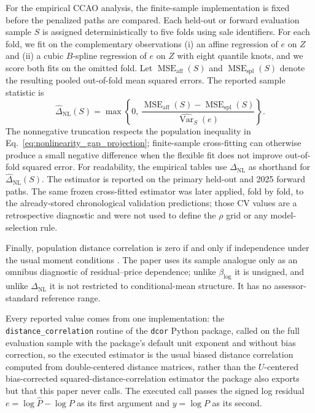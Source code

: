 \documentclass[10pt]{article}
\theoremstyle{definition}
\newcommand{\Var}{\operatorname{Var}}
\newcommand{\1}{\mathbf{1}}
\begin{document}
For the empirical CCAO analysis, the finite-sample implementation is fixed before
the penalized paths are compared. Each held-out or forward evaluation sample $S$ is
assigned deterministically to five folds using sale identifiers. For each fold, we
fit on the complementary observations (i) an affine regression of $e$ on $Z$ and
(ii) a cubic $B$-spline regression of $e$ on $Z$ with eight quantile knots, and we
score both fits on the omitted fold. Let
$\operatorname{MSE}_{\mathrm{aff}}(S)$ and
$\operatorname{MSE}_{\mathrm{spl}}(S)$ denote the resulting pooled out-of-fold mean
squared errors. The reported sample statistic is
\begin{equation}
\label{eq:nonlinearity_gap_estimator}
\widehat{\Delta}_{\mathrm{NL}}(S)
=
\max\left\{
0,\,
\frac{
\operatorname{MSE}_{\mathrm{aff}}(S)
-
\operatorname{MSE}_{\mathrm{spl}}(S)
}{
\widehat{\Var}_S(e)
}
\right\}.
\end{equation}
The nonnegative truncation respects the population inequality in
Eq.~\eqref{eq:nonlinearity_gap_projection}; finite-sample cross-fitting can otherwise
produce a small negative difference when the flexible fit does not improve
out-of-fold squared error. For readability, the empirical tables use
$\Delta_{\mathrm{NL}}$ as shorthand for
$\widehat{\Delta}_{\mathrm{NL}}(S)$.
The estimator is reported on the primary held-out and 2025 forward paths. The same frozen cross-fitted estimator was later applied, fold by fold, to the already-stored chronological validation predictions; those CV values are a retrospective diagnostic and were not used to define the $\rho$ grid or any model-selection rule.

Finally, population distance correlation is zero if and only if independence under
the usual moment conditions \cite{SzekelyRizzoBakirov2007}. The paper uses its
sample analogue only as an omnibus diagnostic of residual--price dependence; unlike
$\beta_{\log}$ it is unsigned, and unlike $\Delta_{\mathrm{NL}}$ it is not restricted
to conditional-mean structure. It has no assessor-standard reference range.

Every reported value comes from one implementation: the
\texttt{distance\_correlation} routine of the \texttt{dcor} Python package, called on the
full evaluation sample with the package's default unit exponent and without bias
correction, so the executed estimator is the usual biased distance correlation computed from
double-centered distance matrices, rather than the $U$-centered bias-corrected
squared-distance-correlation estimator the package also exports but that this paper never calls.
The executed call passes the
signed log residual $e=\log\widehat P-\log P$ as its first argument and $y=\log P$ as its
second.
\end{document}
